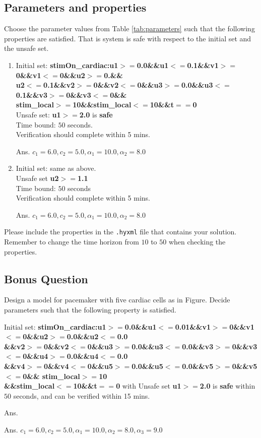 \documentclass[11pt]{article}
\begin{document}
\subsection{Parameters and properties}
Choose the parameter values from Table \ref{tab:parameters} such that the following properties are satisfied. That is system is safe with respect to the initial set and the unsafe set.
\begin{enumerate}
	\item Initial set: 	{\bf stimOn\_cardiac:u1$>=$0.0\&\&u1$<=$0.1\&\&v1$>=$0\&\&v1$<=$0\&\&u2$>=$0.\&\& \\ 
		u2$<=$0.1\&\&v2$>=$0\&\&v2$<=$0\&\&u3$>=$0.0\&\&u3$<=$0.1\&\&v3$>=$0\&\&v3$<=$0\&\& \\
		stim\_local$>=$10\&\&stim\_local$<=$10\&\&t$==$0} \\
	Unsafe set: 
	{\bf u1$>=$2.0} is {\bf safe}\\
	Time bound: $50$ seconds. \\
	Verification should complete within 5 mins.
    
    Ans. $c_1 = 6.0, c_2 = 5.0, \alpha_1 = 10.0, \alpha_2 = 8.0$
    
	\item Initial set: same as above. \\
	Unsafe set {\bf u2$>=$1.1} \\ 
	Time bound: $50$ seconds \\
	Verification should complete within 5 mins.
    
    Ans. $c_1 = 6.0, c_2 = 5.0, \alpha_1 = 10.0, \alpha_2 = 8.0$

\end{enumerate}

Please include the properties in the {\tt .hyxml} file that contains your solution. Remember to change the time horizon from $10$ to $50$ when checking the properties.

\subsection{Bonus Question}
Design a model for pacemaker with five cardiac cells as in Figure. Decide parameters such that the following property is satisfied.

Initial set: {\bf stimOn\_cardiac:u1$>=$0.0\&\&u1$<=$0.01\&\&v1$>=$0\&\&v1$<=$0\&\&u2$>=$0.0\&\&u2$<=$0.0 \\ 
	\&\&v2$>=$0\&\&v2$<=$0\&\&u3$>=$0.0\&\&u3$<=$0.0\&\&v3$>=$0\&\&v3$<=$0\&\&u4$>=$0.0\&\&u4$<=$0.0 \\ \&\&v4$>=$0\&\&v4$<=$0\&\&u5$>=$0.0\&\&u5$<=$0.0\&\&v5$>=$0\&\&v5$<=$0\&\& 
	stim\_local$>=$10 \\ \&\&stim\_local$<=$10\&\&t$==$0}
with Unsafe set 
{\bf u1$>=$2.0} is {\bf safe} within $50$ seconds, and can be verified within 15 mins.

Ans.

    Ans. $c_1 = 6.0, c_2 = 5.0, \alpha_1 = 10.0, \alpha_2 = 8.0, \alpha_3 = 9.0$
 
\end{document}
